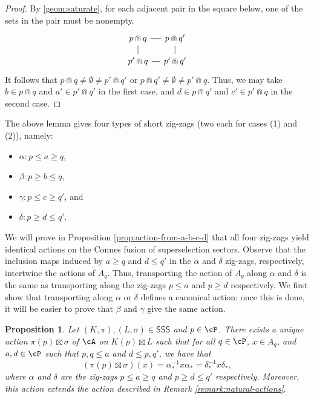\documentclass[11pt,reqno]{amsart}
\newcommand{\SSS}{\mathsf{SSS}}
\numberwithin{equation}{section}
\theoremstyle{plain}
\newtheorem{proposition}[equation]{Proposition}
\theoremstyle{definition}
\begin{document}
\begin{proof}
By \ref{geom:saturate}, for each adjacent pair in the square below, one of the sets in the pair must be nonempty.
\[\begin{tikzcd}[column sep=.5em, row sep=.5em]
	{p\Cap q} && {p\Cap q'} \\
	\\
	{p'\Cap q} && {p'\Cap q'}
	\arrow[no head, from=1-1, to=1-3]
	\arrow[no head, from=1-3, to=3-3]
	\arrow[no head, from=3-1, to=1-1]
	\arrow[no head, from=3-3, to=3-1]
\end{tikzcd}\]    
It follows that $p\Cap q\neq\emptyset\neq p'\Cap q'$ or $p\Cap q'\neq\emptyset\neq p'\Cap q$. Thus, we may take $b\in p\Cap q$ and $a'\in p'\Cap q'$ in the first case, and $d\in p\Cap q'$ and $c'\in p'\Cap q$ in the second case.
\end{proof}

\noindent The above lemma gives four types of short zig-zags (two each for cases (1) and (2)), namely:
\begin{itemize}
    \item $\alpha \colon p \leq a \geq q$,
    \item $\beta\colon  p\geq b \leq q$,
    \item $\gamma\colon  p\leq c \geq q'$, and
    \item $\delta\colon p \geq d \leq q'$.
\end{itemize}
We will prove in Proposition \ref{prop:action-from-a-b-c-d} that all four zig-zags yield identical actions on the Connes fusion of superselection sectors. Observe that the inclusion maps induced by $a \geq q$ and $d \leq q'$ in the $\alpha$ and $\delta$ zig-zags, respectively, intertwine the actions of $A_q$. Thus, transporting the action of $A_q$ along $\alpha$ and $\delta$ is the same as transporting along the zig-zags $p\leq a$ and $p\geq d$ respectively. We first show that transporting along $\alpha$ or $\delta$ defines a canonical action: once this is done, it will be easier to prove that $\beta$ and $\gamma$ give the same action.

\begin{proposition}\label{prop:action-from-a-and-d}
    Let $(K,\pi),(L,\sigma)\in\SSS$ and $p\in {\cP}$. There exists a unique action $\pi(p)\boxtimes \sigma$ of $\cA$ on $K(p)\boxtimes L$ such that for all $q\in{\cP}$, $x\in A_q$, and $a,d\in{\cP}$ such that $p,q\leq a$ and $d\leq p,q'$, we have that
    \[
    (\pi(p)\boxtimes \sigma)(x)=\alpha_*^{-1}x\alpha_*=\delta_*^{-1}x\delta_*,
    \]
    where $\alpha$ and $\delta$ are the zig-zags $p\leq a\geq q$ and $p\geq d\leq q'$ respectively. Moreover, this action extends the action described in Remark \ref{remark:natural-actions}.
\end{proposition}
\end{document}
